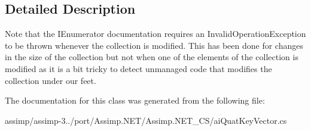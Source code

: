 \subsection{Detailed Description}
Note that the I\+Enumerator documentation requires an Invalid\+Operation\+Exception to be thrown whenever the collection is modified. This has been done for changes in the size of the collection but not when one of the elements of the collection is modified as it is a bit tricky to detect unmanaged code that modifies the collection under our feet. 

The documentation for this class was generated from the following file\+:\begin{DoxyCompactItemize}
\item 
assimp/assimp-\/3../port/\+Assimp.\+N\+E\+T/\+Assimp.\+N\+E\+T\+\_\+\+C\+S/ai\+Quat\+Key\+Vector.\+cs\end{DoxyCompactItemize}
